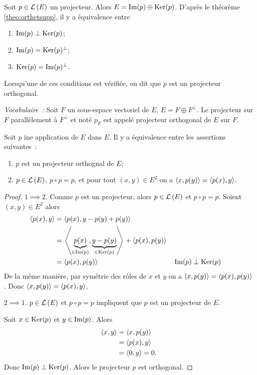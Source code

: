 Soit \(p \in \mathcal{L}\left(E\right)\) un projecteur. Alors \(E = \operatorname{Im}(p)\oplus \operatorname{Ker}(p)\). 
D'après le théorème~
\ref{theo:orthetsupp}, il y a équivalence entre
\begin{enumerate}
  \item \(\operatorname{Im}(p) \perp \operatorname{Ker}(p)\);
  \item \(\operatorname{Im}(p) = \operatorname{Ker}(p)^\perp\);
  \item \(\operatorname{Ker}(p) = \operatorname{Im}(p)^\perp\).
\end{enumerate}
Lorsqu'une de ces conditions est vérifiée, on dit que \(p\) est un projecteur 
orthogonal.

\emph{Vocabulaire~:} Soit \(F\) un sous-espace vectoriel de \(E\), \(E = F 
\oplus F^\perp\). Le projecteur sur \(F\) parallélement à \(F^\perp\) et noté 
\(p_F\) est appelé projecteur orthogonal de \(E\) sur \(F\).

\begin{theo}
  Soit \(p\) ine application de \(E\) dans \(E\). Il y a équivalence entre les 
  assertions suivantes~:
  \begin{enumerate}
    \item \(p\) est un projecteur orthognal de \(E\);
    \item \(p \in \mathcal{L}\left(E\right)\), \(p \circ p =p\), et pour tout \((x,y) \in E^2\) 
      on a \(\left\langle{x},{p(y)}\right\rangle=\left\langle{p(x)},{y}\right\rangle\).
  \end{enumerate}
\end{theo}
\begin{proof}
  \(1 \implies 2\). Comme \(p\) est un projecteur, alors \(p \in \mathcal{L}\left(E\right)\) et 
  \(p \circ p =p\). Soient \((x,y) \in E^2\) alors
  \begin{align}
    \left\langle{p(x)},{y}\right\rangle &=  \left\langle{p(x)},{y-p(y)+p(y)}\right\rangle \\
    &= \left\langle{\underbrace{p(x)}_{\in \operatorname{Im}(p)}},{\underbrace{y-p(y)}_{\in 
    \operatorname{Ker}(p)}}\right\rangle+\left\langle{p(x)},{p(y)}\right\rangle \\
    &=  \left\langle{p(x)},{p(y)}\right\rangle && \operatorname{Im}(p) \perp \operatorname{Ker}(p)
  \end{align}
  De la même manière, par symétrie des rôles de \(x\) et \(y\) on a 
  \(\left\langle{x},{p(y)}\right\rangle=\left\langle{p(x)},{p(y)}\right\rangle\). Donc 
  \(\left\langle{x},{p(y)}\right\rangle=\left\langle{p(x)},{y}\right\rangle\).

  \(2 \implies 1\). \(p \in \mathcal{L}\left(E\right)\) et \(p \circ p =p\) impliquent que 
  \(p\) est un projecteur de \(E\).

  Soit \(x \in \operatorname{Ker}(p)\) et \(y \in \operatorname{Im}(p)\). Alors
  \begin{align}
    \left\langle{x},{y}\right\rangle &= \left\langle{x},{p(y)}\right\rangle \\
    &=\left\langle{p(x)},{y}\right\rangle \\
    &=\left\langle{0},{y}\right\rangle=0.
  \end{align}
  Donc \(\operatorname{Im}(p) \perp \operatorname{Ker}(p)\). Alors le projecteur \(p\) est orthogonal.
\end{proof}


